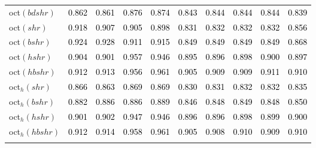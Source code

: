 \begin{tabular}[t]{l|ccccccccc}
oct$(bdshr)$ & \textcolor{black}{0.862} & \textcolor{black}{0.861} & \textcolor{black}{0.876} & \textcolor{black}{0.874} & \textcolor{black}{0.843} & \textcolor{black}{0.844} & \textcolor{black}{0.844} & \textcolor{black}{0.844} & \textcolor{black}{0.839}\\
oct$(shr)$ & \textcolor{black}{0.918} & \textcolor{black}{0.907} & \textcolor{black}{0.905} & \textcolor{black}{0.898} & \textcolor{black}{0.831} & \textcolor{black}{0.832} & \textcolor{black}{0.832} & \textcolor{black}{0.832} & \textcolor{black}{0.856}\\
oct$(bshr)$ & \textcolor{black}{0.924} & \textcolor{black}{0.928} & \textcolor{black}{0.911} & \textcolor{black}{0.915} & \textcolor{black}{0.849} & \textcolor{black}{0.849} & \textcolor{black}{0.849} & \textcolor{black}{0.849} & \textcolor{black}{0.868}\\
oct$(hshr)$ & \textcolor{black}{0.904} & \textcolor{black}{0.901} & \textcolor{black}{0.957} & \textcolor{black}{0.946} & \textcolor{black}{0.895} & \textcolor{black}{0.896} & \textcolor{black}{0.898} & \textcolor{black}{0.900} & \textcolor{black}{0.897}\\
oct$(hbshr)$ & \textcolor{black}{0.912} & \textcolor{black}{0.913} & \textcolor{black}{0.956} & \textcolor{black}{0.961} & \textcolor{black}{0.905} & \textcolor{black}{0.909} & \textcolor{black}{0.909} & \textcolor{black}{0.911} & \textcolor{black}{0.910}\\
oct$_h(shr)$ & \textcolor{black}{0.866} & \textcolor{black}{0.863} & \textcolor{black}{0.869} & \textcolor{black}{0.869} & \textcolor{black}{0.830} & \textcolor{black}{0.831} & \textcolor{black}{0.832} & \textcolor{black}{0.832} & \textcolor{black}{0.835}\\
oct$_h(bshr)$ & \textcolor{black}{0.882} & \textcolor{black}{0.886} & \textcolor{black}{0.886} & \textcolor{black}{0.889} & \textcolor{black}{0.846} & \textcolor{black}{0.848} & \textcolor{black}{0.849} & \textcolor{black}{0.848} & \textcolor{black}{0.850}\\
oct$_h(hshr)$ & \textcolor{black}{0.901} & \textcolor{black}{0.902} & \textcolor{black}{0.947} & \textcolor{black}{0.946} & \textcolor{black}{0.896} & \textcolor{black}{0.896} & \textcolor{black}{0.898} & \textcolor{black}{0.899} & \textcolor{black}{0.900}\\
oct$_h(hbshr)$ & \textcolor{black}{0.912} & \textcolor{black}{0.914} & \textcolor{black}{0.958} & \textcolor{black}{0.961} & \textcolor{black}{0.905} & \textcolor{black}{0.908} & \textcolor{black}{0.910} & \textcolor{black}{0.909} & \textcolor{black}{0.910}\\[-1.5ex]
\hline\\[-1.5ex]
\bottomrule
\end{tabular}
